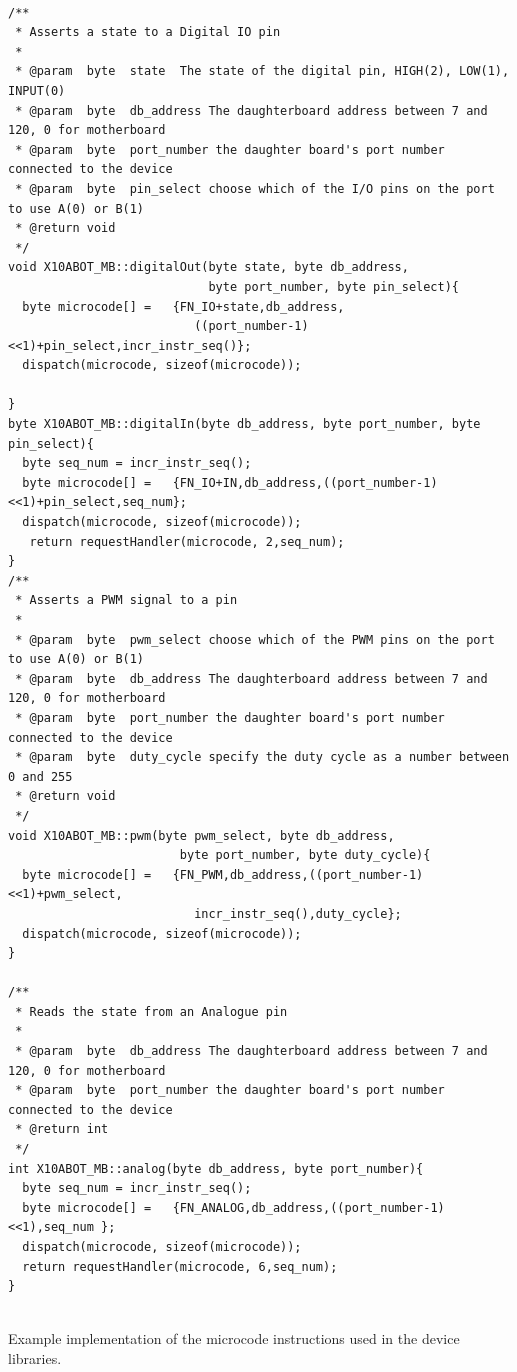 \begin{listing}[h]
\footnotesize
{\fontsize{8}{6}\selectfont
\begin{verbatim}

/**
 * Asserts a state to a Digital IO pin
 *
 * @param  byte  state  The state of the digital pin, HIGH(2), LOW(1), INPUT(0)
 * @param  byte  db_address The daughterboard address between 7 and 120, 0 for motherboard
 * @param  byte  port_number the daughter board's port number connected to the device
 * @param  byte  pin_select choose which of the I/O pins on the port to use A(0) or B(1)
 * @return void
 */
void X10ABOT_MB::digitalOut(byte state, byte db_address, 
                            byte port_number, byte pin_select){
  byte microcode[] =   {FN_IO+state,db_address,
                          ((port_number-1)<<1)+pin_select,incr_instr_seq()};
  dispatch(microcode, sizeof(microcode));

}
byte X10ABOT_MB::digitalIn(byte db_address, byte port_number, byte pin_select){
  byte seq_num = incr_instr_seq();
  byte microcode[] =   {FN_IO+IN,db_address,((port_number-1)<<1)+pin_select,seq_num};
  dispatch(microcode, sizeof(microcode));
   return requestHandler(microcode, 2,seq_num);
}
/**
 * Asserts a PWM signal to a pin
 *
 * @param  byte  pwm_select choose which of the PWM pins on the port to use A(0) or B(1)
 * @param  byte  db_address The daughterboard address between 7 and 120, 0 for motherboard
 * @param  byte  port_number the daughter board's port number connected to the device
 * @param  byte  duty_cycle specify the duty cycle as a number between 0 and 255
 * @return void
 */
void X10ABOT_MB::pwm(byte pwm_select, byte db_address, 
                        byte port_number, byte duty_cycle){
  byte microcode[] =   {FN_PWM,db_address,((port_number-1)<<1)+pwm_select,
                          incr_instr_seq(),duty_cycle};
  dispatch(microcode, sizeof(microcode));
}

/**
 * Reads the state from an Analogue pin
 *
 * @param  byte  db_address The daughterboard address between 7 and 120, 0 for motherboard
 * @param  byte  port_number the daughter board's port number connected to the device
 * @return int
 */
int X10ABOT_MB::analog(byte db_address, byte port_number){
  byte seq_num = incr_instr_seq();
  byte microcode[] =   {FN_ANALOG,db_address,((port_number-1)<<1),seq_num };
  dispatch(microcode, sizeof(microcode));
  return requestHandler(microcode, 6,seq_num);
}


\end{verbatim}
}
\caption{Example implementation of the \xten microcode instructions used in the device libraries.} \label{code:micro}
\end{listing}	


